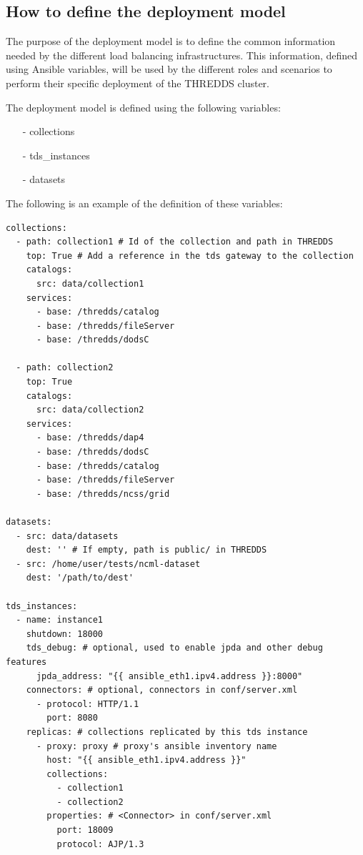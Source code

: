 \documentclass[a4paper,12pt]{article}
\begin{document}
\subsection{How to define the deployment model}

The purpose of the deployment model is to define the common information needed by the different load balancing infrastructures. This information, defined using Ansible variables, will be used by the different roles and scenarios to perform their specific deployment of the THREDDS cluster.

The deployment model is defined using the following variables:

\begin{itemize}
\item[-] collections
\item[-] tds\_instances
\item[-] datasets
\end{itemize}

The following is an example of the definition of these variables:

\begin{lstlisting}
collections:
  - path: collection1 # Id of the collection and path in THREDDS
    top: True # Add a reference in the tds gateway to the collection
    catalogs:
      src: data/collection1
    services: 
      - base: /thredds/catalog
      - base: /thredds/fileServer
      - base: /thredds/dodsC

  - path: collection2
    top: True
    catalogs:
      src: data/collection2
    services:
      - base: /thredds/dap4
      - base: /thredds/dodsC
      - base: /thredds/catalog
      - base: /thredds/fileServer
      - base: /thredds/ncss/grid

datasets:
  - src: data/datasets
    dest: '' # If empty, path is public/ in THREDDS
  - src: /home/user/tests/ncml-dataset
    dest: '/path/to/dest'

tds_instances:
  - name: instance1
    shutdown: 18000
    tds_debug: # optional, used to enable jpda and other debug features
      jpda_address: "{{ ansible_eth1.ipv4.address }}:8000"
    connectors: # optional, connectors in conf/server.xml
      - protocol: HTTP/1.1
        port: 8080
    replicas: # collections replicated by this tds instance
      - proxy: proxy # proxy's ansible inventory name 
        host: "{{ ansible_eth1.ipv4.address }}" 
        collections: 
          - collection1
          - collection2
        properties: # <Connector> in conf/server.xml
          port: 18009
          protocol: AJP/1.3
\end{lstlisting}
\end{document}
